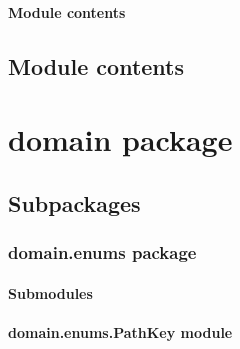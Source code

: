 \documentclass[letterpaper,10pt,english]{sphinxmanual}
\begin{document}
\paragraph{Module contents}
\label{\detokenize{application.services:module-application.services}}\label{\detokenize{application.services:module-contents}}

\subsection{Module contents}
\label{\detokenize{application:module-application}}\label{\detokenize{application:module-contents}}
\sphinxstepscope


\section{domain package}
\label{\detokenize{domain:domain-package}}\label{\detokenize{domain::doc}}

\subsection{Subpackages}
\label{\detokenize{domain:subpackages}}
\sphinxstepscope


\subsubsection{domain.enums package}
\label{\detokenize{domain.enums:domain-enums-package}}\label{\detokenize{domain.enums::doc}}

\paragraph{Submodules}
\label{\detokenize{domain.enums:submodules}}

\paragraph{domain.enums.PathKey module}
\label{\detokenize{domain.enums:module-domain.enums.PathKey}}\label{\detokenize{domain.enums:domain-enums-pathkey-module}}
\end{document}
